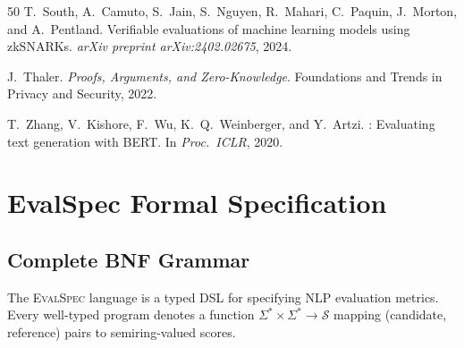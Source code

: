 \documentclass[11pt]{article}
\newcommand{\evalspec}{\textsc{EvalSpec}}
\newcommand{\semiring}[1]{\mathcal{#1}}
\begin{document}
\begin{thebibliography}{50}
T.~South, A.~Camuto, S.~Jain, S.~Nguyen, R.~Mahari, C.~Paquin, J.~Morton,
  and A.~Pentland.
\newblock Verifiable evaluations of machine learning models using {zkSNARKs}.
\newblock \emph{arXiv preprint arXiv:2402.02675}, 2024.

J.~Thaler.
\newblock \emph{Proofs, Arguments, and Zero-Knowledge}.
\newblock Foundations and Trends in Privacy and Security, 2022.

T.~Zhang, V.~Kishore, F.~Wu, K.~Q.~Weinberger, and Y.~Artzi.
: Evaluating text generation with {BERT}.
\newblock In \emph{Proc.\ ICLR}, 2020.

\end{thebibliography}


\clearpage
\appendix

\section{EvalSpec Formal Specification}\label{app:evalspec-formal}

\subsection{Complete BNF Grammar}

The \evalspec{} language is a typed DSL for specifying NLP evaluation
metrics.  Every well-typed program denotes a function
$\Sigma^* \times \Sigma^* \to \semiring{S}$ mapping (candidate, reference)
pairs to semiring-valued scores.
\end{document}
